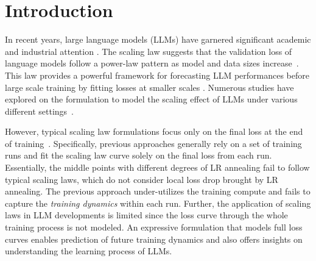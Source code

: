 
\section{Introduction}
In recent years, large language models (LLMs) have garnered significant academic and industrial attention \citep{browngpt3_2020,touvron2023llama}. The scaling law suggests that the validation loss of language models follow a power-law pattern as model and data sizes increase~\citep{hestness2017deep,kaplan2020scaling,henighan2020scaling}. This law provides a powerful framework for forecasting LLM performances before large scale training by fitting losses at smaller scales \citep{achiam2023gpt,deepseek-ai2024deepseek,dubey2024llama}. Numerous studies have explored on the formulation to model the scaling effect of LLMs under various different settings~\citep{bahri2021explaining,hernandez2021scaling,caballero2022broken,Quantization-scaling,muennighoff2023scaling}.

However, typical scaling law formulations focus only on the final loss at the end of training~\citep{hoffmann2022training}. Specifically, previous approaches generally rely on a set of training runs and fit the scaling law curve solely on the final loss from each run. Essentially, the middle points with different degrees of LR annealing fail to follow typical scaling laws, which do not consider local loss drop brought by LR annealing. 
The previous approach under-utilizes the training compute and fails to capture the \emph{training dynamics} within each run. Further, the application of scaling laws in LLM developments is limited since the loss curve through the whole training process is not modeled. An expressive formulation that models full loss curves enables prediction of future training dynamics and also offers insights on understanding the learning process of LLMs.

